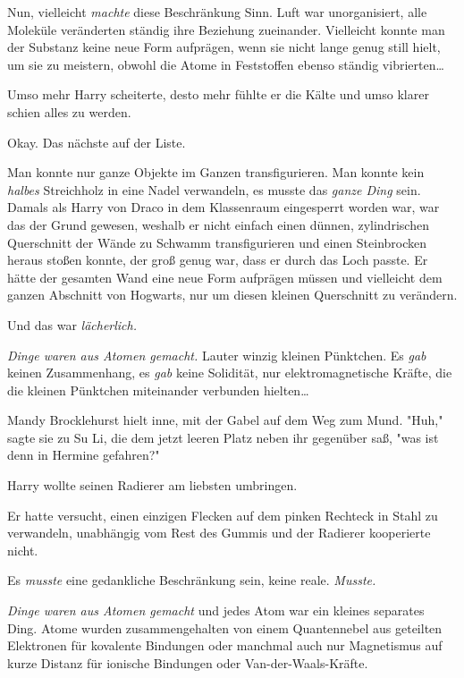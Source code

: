 {Nun, vielleicht \emph{machte} diese Beschränkung Sinn. Luft war unorganisiert, alle Moleküle veränderten ständig ihre Beziehung zueinander. Vielleicht konnte man der Substanz keine neue Form aufprägen, wenn sie nicht lange genug still hielt, um sie zu meistern, obwohl die Atome in Feststoffen ebenso ständig vibrierten…

Umso mehr Harry scheiterte, desto mehr fühlte er die Kälte und umso klarer schien alles zu werden.

Okay. Das nächste auf der Liste.

Man konnte nur ganze Objekte im Ganzen transfigurieren. Man konnte kein \emph{halbes} Streichholz in eine Nadel verwandeln, es musste das \emph{ganze Ding} sein. Damals als Harry von Draco in dem Klassenraum eingesperrt worden war, war das der Grund gewesen, weshalb er nicht einfach einen dünnen, zylindrischen Querschnitt der Wände zu Schwamm transfigurieren und einen Steinbrocken heraus stoßen konnte, der groß genug war, dass er durch das Loch passte. Er hätte der gesamten Wand eine neue Form aufprägen müssen und vielleicht dem ganzen Abschnitt von Hogwarts, nur um diesen kleinen Querschnitt zu verändern.

Und das war \emph{lächerlich.}

\emph{Dinge waren aus Atomen gemacht.} Lauter winzig kleinen Pünktchen. Es \emph{gab} keinen Zusammenhang, es \emph{gab} keine Solidität, nur elektromagnetische Kräfte, die die kleinen Pünktchen miteinander verbunden hielten…

\later

Mandy Brocklehurst hielt inne, mit der Gabel auf dem Weg zum Mund. "Huh," sagte sie zu Su Li, die dem jetzt leeren Platz neben ihr gegenüber saß, "was ist denn in Hermine gefahren?"

\later

Harry wollte seinen Radierer am liebsten umbringen.

Er hatte versucht, einen einzigen Flecken auf dem pinken Rechteck in Stahl zu verwandeln, unabhängig vom Rest des Gummis und der Radierer kooperierte nicht.

Es \emph{musste} eine gedankliche Beschränkung sein, keine reale. \emph{Musste.}

\emph{Dinge waren aus Atomen gemacht} und jedes Atom war ein kleines separates Ding. Atome wurden zusammengehalten von einem Quantennebel aus geteilten Elektronen für kovalente Bindungen oder manchmal auch nur Magnetismus auf kurze Distanz für ionische Bindungen oder Van-der-Waals-Kräfte.

}
